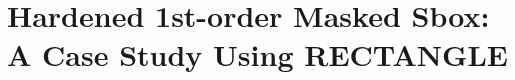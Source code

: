 \section{Hardened 1st-order Masked Sbox: A Case Study Using RECTANGLE}\label{sec:rectangle}

















